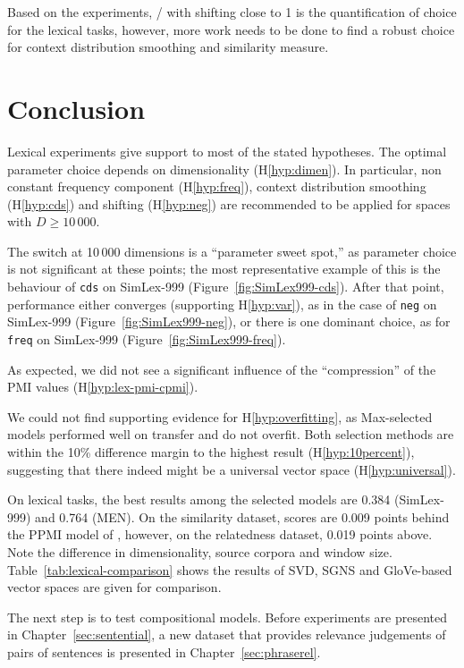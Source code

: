 Based on the experiments, \logNSCPMI/ with shifting close to 1 is the quantification of choice for the lexical tasks, however, more work needs to be done to find a robust choice for context distribution smoothing and similarity measure.

\section{Conclusion}
\label{sec:conclusion-lexical}

Lexical experiments give support to most of the stated hypotheses. The optimal parameter choice depends on dimensionality (H\ref{hyp:dimen}). In particular, non constant frequency component (H\ref{hyp:freq}), context distribution smoothing (H\ref{hyp:cds}) and shifting (H\ref{hyp:neg}) are recommended to be applied for spaces with $D \geq 10\,000$.

The switch at 10\,000 dimensions is a ``parameter sweet spot,'' as parameter choice is not significant at these points; the most representative example of this is the behaviour of \texttt{cds} on SimLex-999 (Figure~\ref{fig:SimLex999-cds}). After that point, performance either converges (supporting H\ref{hyp:var}), as in the case of \texttt{neg} on SimLex-999 (Figure~\ref{fig:SimLex999-neg}), or there is one dominant choice, as for \texttt{freq} on SimLex-999 (Figure~\ref{fig:SimLex999-freq}).

As expected, we did not see a significant influence of the ``compression'' of the PMI values (H\ref{hyp:lex-pmi-cpmi}).

We could not find supporting evidence for H\ref{hyp:overfitting}, as Max-selected models performed well on transfer and do not overfit. Both selection methods are within the 10\% difference margin to the highest result (H\ref{hyp:10percent}), suggesting that there indeed might be a universal vector space (H\ref{hyp:universal}).


On lexical tasks, the best results among the selected models are 0.384 (SimLex-999) and 0.764 (MEN). On the similarity dataset, scores are 0.009 points behind the PPMI model of , however, on the relatedness dataset, 0.019 points above. Note the difference in dimensionality, source corpora and window size. Table~\ref{tab:lexical-comparison} shows the results of SVD, SGNS and GloVe-based vector spaces are given for comparison.

The next step is to test compositional models. Before experiments are presented in Chapter~\ref{sec:sentential}, a new dataset that provides relevance judgements of pairs of sentences is presented in Chapter~\ref{sec:phraserel}.

